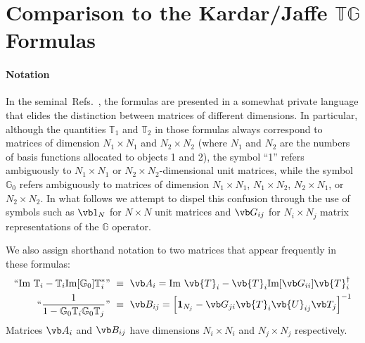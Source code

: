 \documentclass[letterpaper]{article}
\newcommand{\citeasnouns}[1]{Refs.~\citen{#1}}
\begin{document}
\newpage
\section{Comparison to the Kardar/Jaffe 
         $\mathbb{T}\mathbb{G}$ Formulas}

\paragraph{Notation}
In the seminal~\citeasnouns{Rahi2009, Kruger2012}, the 
formulas
are presented in a somewhat private language that elides the 
distinction between matrices of different dimensions. In particular,
although the quantities $\mathbb{T}_1$ and $\mathbb{T}_2$
in those formulas always correspond to matrices of dimension 
$N_1\times N_1$ and $N_2\times N_2$ (where $N_1$ and $N_2$ 
are the numbers of basis functions allocated to objects 1 and 2), 
the symbol ``1'' refers ambiguously to $N_1\times N_1$ or 
$N_2\times N_2$-dimensional unit matrices, while the symbol
$\mathbb{G}_0$ refers ambiguously to matrices of dimension
$N_1\times N_1$, $N_1\times N_2$, $N_2\times N_1$, or
$N_2\times N_2$. In what follows we attempt to dispel this 
confusion through the use of symbols such as $\vb 1_{N}$ 
for $N\times N$ unit matrices and $\vb G_{ij}$ for 
$N_i\times N_j$ matrix representations of the $\mathbb{G}$ operator.

We also assign shorthand notation to two matrices that appear 
frequently in these formulas:
\begin{align*}
\text{``}
 \text{Im }\mathbb{T}_i - 
           \mathbb{T}_i \text{Im}[\mathbb{G}_0]\mathbb{T}_i^*
 \text{''}
&\,\,\equiv\,\, \vb A_i 
 = \text{Im }\vb{T}_i - \vb{T}_i \text{Im}[\vb G_{ii}]\vb{T}_i^\dagger
\\
\text{``}
\frac{1}{1-\mathbb{G}_0 \mathbb{T}_i \mathbb{G}_0 \mathbb{T}_j}
\text{''}
&\,\,\equiv\,\, \vb B_{ij}
= \Big[ \mathbf{1}_{N_j}
         -\vb G_{ji} \vb{T}_i \vb{U}_{ij} \vb T_j
   \Big]^{-1}
\end{align*}
Matrices $\vb A_i$ and $\vb B_{ij}$ have dimensions $N_i\times N_i$ 
and $N_j \times N_j$ respectively.
\end{document}
